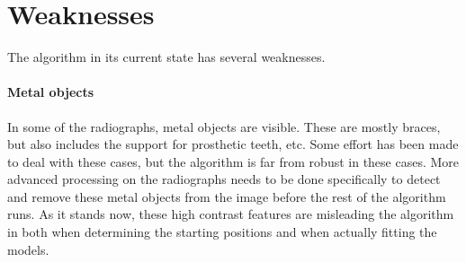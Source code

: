 \documentclass[a4paper,10pt]{article}
\begin{document}
\section{Weaknesses}
The algorithm in its current state has several weaknesses.

\paragraph{Metal objects} In some of the radiographs, metal objects are visible. These are mostly braces, but also includes the support for prosthetic teeth, etc. Some effort has been made to deal with these cases, but the algorithm is far from robust in these cases. More advanced processing on the radiographs needs to be done specifically to detect and remove these metal objects from the image before the rest of the algorithm runs. As it stands now, these high contrast features are misleading the algorithm in both when determining the starting positions and when actually fitting the models.
\end{document}
